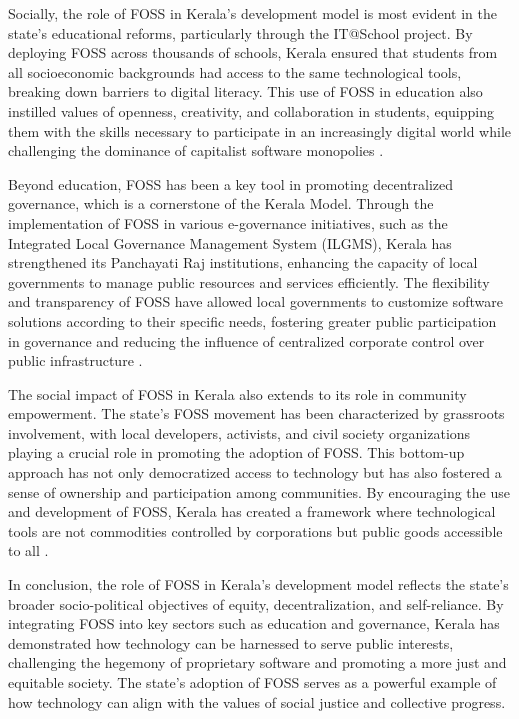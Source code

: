 \begin{refsection}
Socially, the role of FOSS in Kerala’s development model is most evident in the state’s educational reforms, particularly through the IT@School project. By deploying FOSS across thousands of schools, Kerala ensured that students from all socioeconomic backgrounds had access to the same technological tools, breaking down barriers to digital literacy. This use of FOSS in education also instilled values of openness, creativity, and collaboration in students, equipping them with the skills necessary to participate in an increasingly digital world while challenging the dominance of capitalist software monopolies \cite[pp.~10-11]{prabhakar2010itschool}. 

Beyond education, FOSS has been a key tool in promoting decentralized governance, which is a cornerstone of the Kerala Model. Through the implementation of FOSS in various e-governance initiatives, such as the Integrated Local Governance Management System (ILGMS), Kerala has strengthened its Panchayati Raj institutions, enhancing the capacity of local governments to manage public resources and services efficiently. The flexibility and transparency of FOSS have allowed local governments to customize software solutions according to their specific needs, fostering greater public participation in governance and reducing the influence of centralized corporate control over public infrastructure \cite[pp.~45-47]{isaac2000local}.

The social impact of FOSS in Kerala also extends to its role in community empowerment. The state’s FOSS movement has been characterized by grassroots involvement, with local developers, activists, and civil society organizations playing a crucial role in promoting the adoption of FOSS. This bottom-up approach has not only democratized access to technology but has also fostered a sense of ownership and participation among communities. By encouraging the use and development of FOSS, Kerala has created a framework where technological tools are not commodities controlled by corporations but public goods accessible to all \cite[pp.~156-159]{palackal2007information}.

In conclusion, the role of FOSS in Kerala’s development model reflects the state’s broader socio-political objectives of equity, decentralization, and self-reliance. By integrating FOSS into key sectors such as education and governance, Kerala has demonstrated how technology can be harnessed to serve public interests, challenging the hegemony of proprietary software and promoting a more just and equitable society. The state's adoption of FOSS serves as a powerful example of how technology can align with the values of social justice and collective progress.


\end{refsection}
